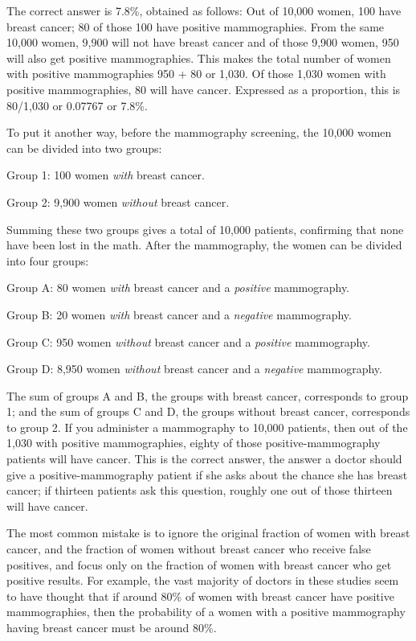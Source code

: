 {
 The correct answer is 7.8\%, obtained as follows: Out of 10,000
women, 100 have breast cancer; 80 of those 100 have positive
mammographies. From the same 10,000 women, 9,900 will not have breast
cancer and of those 9,900 women, 950 will also get positive
mammographies. This makes the total number of women with positive
mammographies 950 + 80 or 1,030. Of those 1,030 women with positive
mammographies, 80 will have cancer. Expressed as a proportion, this is
80/1,030 or 0.07767 or 7.8\%.}

{
 To put it another way, before the mammography screening, the
10,000 women can be divided into two groups:}

{
 Group 1: 100 women \textit{with} breast cancer.}

{
 Group 2: 9,900 women \textit{without} breast cancer.}

{
 Summing these two groups gives a total of 10,000 patients,
confirming that none have been lost in the math. After the mammography,
the women can be divided into four groups:}

{
 Group A: 80 women \textit{with} breast cancer and a
\textit{positive} mammography.}

{
 Group B: 20 women \textit{with} breast cancer and a
\textit{negative} mammography.}

{
 Group C: 950 women \textit{without} breast cancer and a
\textit{positive} mammography.}

{
 Group D: 8,950 women \textit{without} breast cancer and a
\textit{negative} mammography.}

{
 The sum of groups A and B, the groups with breast cancer,
corresponds to group 1; and the sum of groups C and D, the groups
without breast cancer, corresponds to group 2. If you administer a
mammography to 10,000 patients, then out of the 1,030 with positive
mammographies, eighty of those positive-mammography patients will have
cancer. This is the correct answer, the answer a doctor should give a
positive-mammography patient if she asks about the chance she has
breast cancer; if thirteen patients ask this question, roughly one out
of those thirteen will have cancer.}

{
 The most common mistake is to ignore the original fraction of
women with breast cancer, and the fraction of women without breast
cancer who receive false positives, and focus only on the fraction of
women with breast cancer who get positive results. For example, the
vast majority of doctors in these studies seem to have thought that if
around 80\% of women with breast cancer have positive mammographies,
then the probability of a women with a positive mammography having
breast cancer must be around 80\%.}

